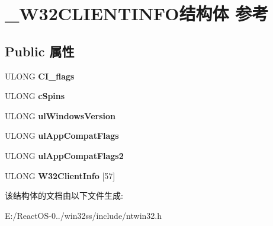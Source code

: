 \hypertarget{struct___w32_c_l_i_e_n_t_i_n_f_o}{}\section{\+\_\+\+W32\+C\+L\+I\+E\+N\+T\+I\+N\+F\+O结构体 参考}
\label{struct___w32_c_l_i_e_n_t_i_n_f_o}
\subsection*{Public 属性}
\begin{DoxyCompactItemize}
\item 
\mbox{\label{struct___w32_c_l_i_e_n_t_i_n_f_o_a76acc3c3930fa22bf4a55c67712b7038}} 
U\+L\+O\+NG {\bfseries C\+I\+\_\+flags}
\item 
\mbox{\label{struct___w32_c_l_i_e_n_t_i_n_f_o_a7f89bc3ef5c983ee18b10970536c5d45}} 
U\+L\+O\+NG {\bfseries c\+Spins}
\item 
\mbox{\label{struct___w32_c_l_i_e_n_t_i_n_f_o_ac28091460c95a5501252a8a33289b03c}} 
U\+L\+O\+NG {\bfseries ul\+Windows\+Version}
\item 
\mbox{\label{struct___w32_c_l_i_e_n_t_i_n_f_o_ad3f092a9e1e1d1213434f8ca287da641}} 
U\+L\+O\+NG {\bfseries ul\+App\+Compat\+Flags}
\item 
\mbox{\label{struct___w32_c_l_i_e_n_t_i_n_f_o_aef8d48664b037b79984c0ad2d5465d86}} 
U\+L\+O\+NG {\bfseries ul\+App\+Compat\+Flags2}
\item 
\mbox{\label{struct___w32_c_l_i_e_n_t_i_n_f_o_aa815605556f30fb766b2544a5b363084}} 
U\+L\+O\+NG {\bfseries W32\+Client\+Info} \mbox{[}57\mbox{]}
\end{DoxyCompactItemize}


该结构体的文档由以下文件生成\+:\begin{DoxyCompactItemize}
\item 
E\+:/\+React\+O\+S-\/0../win32ss/include/ntwin32.\+h\end{DoxyCompactItemize}
